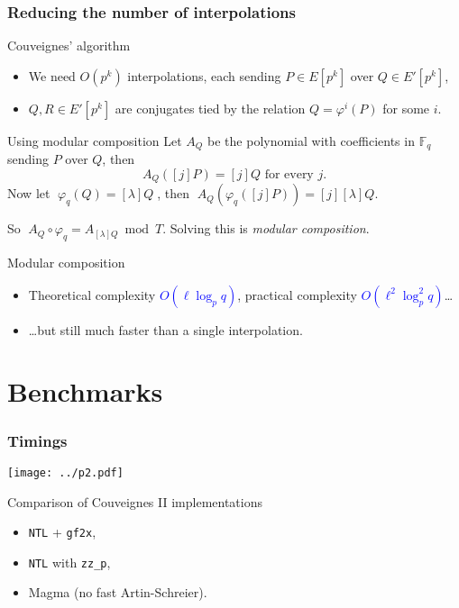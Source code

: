 \documentclass[10pt]{beamer}
\newcommand{\blue}[1]{\textcolor{blue}{#1}}  %
\newcommand{\F}{\mathbb{F}}  %
\newcommand{\frob}{\varphi}  %
\newcommand{\0}{\mathcal{O}}  %
\begin{document}

\begin{frame}
  \frametitle{Reducing the number of interpolations}

  \begin{block}{Couveignes' algorithm}
    \begin{itemize}
    \item We need $O(p^k)$ interpolations, each sending $P\in E[p^k]$
      over $Q\in E'[p^k]$,
    \item $Q,R\in E'[p^k]$ are conjugates tied by the relation
      $Q=\frob^i(P)$ for some $i$.
    \end{itemize}
  \end{block}

  \begin{block}{Using modular composition}
    Let $A_Q$ be the polynomial with coefficients in $\F_q$ sending
    $P$ over $Q$, then
    \[A_Q([j]P) = [j]Q \text{ for every $j$.}\]
    Now let $\;\frob_q(Q) = [\lambda]Q\;$, then $\;A_Q(\frob_q([j]P)) =
    [j][\lambda]Q$.

    So \alert{$\;A_Q\circ\frob_q = A_{[\lambda]Q} \bmod T$}. Solving this
    is \emph{modular composition}.
  \end{block}

  \begin{block}{Modular composition}
    \begin{itemize}
    \item Theoretical complexity \blue{$O(\ell\log_pq)$}, practical
      complexity \blue{$O(\ell^2\log_p^2q)$}\dots
    \item \dots but still much faster than a single interpolation.
    \end{itemize}
  \end{block}
\end{frame}


\section{Benchmarks}

\begin{frame}
  \frametitle{Timings}
  
  \texttt{[image: ../p2.pdf]}

  \begin{block}{Comparison of Couveignes II implementations}
    \begin{itemize}
    \item \texttt{NTL} + \texttt{gf2x},
    \item \texttt{NTL} with \texttt{zz\_p},
    \item Magma (no fast Artin-Schreier).
    \end{itemize}
  \end{block}
\end{frame}
\end{document}
